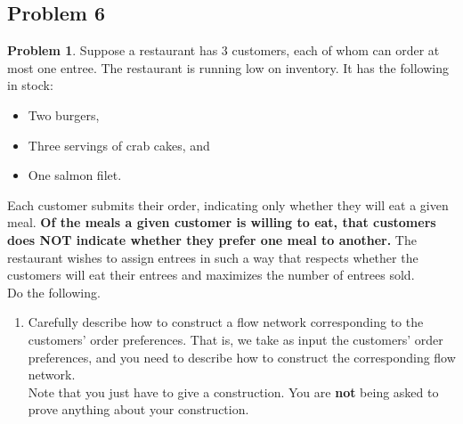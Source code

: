 \documentclass[11pt]{article}
\theoremstyle{definition}
\theoremstyle{definition}
\newtheorem{required}{Problem}
\theoremstyle{definition}
\begin{document}
\newpage
\subsection{Problem 6}
\begin{required}
Suppose a restaurant has $3$ customers, each of whom can order at most one entree. The restaurant is running low on inventory. It has the following in stock:
\begin{itemize}
\item Two burgers,
\item Three servings of crab cakes, and
\item One salmon filet.
\end{itemize} 

\noindent Each customer submits their order, indicating only whether they will eat a given meal. \textbf{Of the meals a given customer is willing to eat, that customers does NOT indicate whether they prefer one meal to another.} The restaurant wishes to assign entrees in such a way that respects whether the customers will eat their entrees and maximizes the number of entrees sold. \\

\noindent Do the following.
\begin{enumerate}[label=(\alph*)]
\subsubsection{Problem 6\ref{S114a}}
\item \label{S114a} Carefully describe how to construct a flow network corresponding to the customers' order preferences. That is, we take as input the customers' order preferences, and you need to describe how to construct the corresponding flow network. \\

\noindent Note that you just have to give a construction. You are \textbf{not} being asked to prove anything about your construction.


\end{enumerate}
\end{required}
\end{document}
